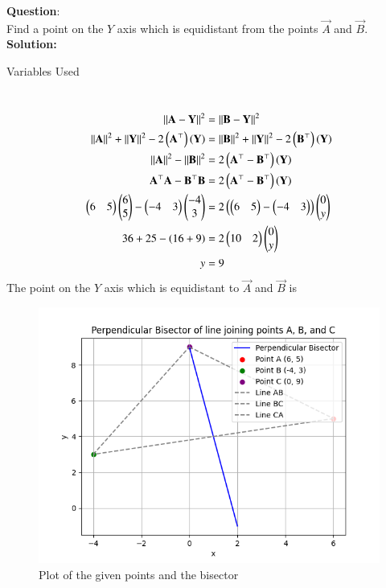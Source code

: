 \documentclass[journal]{IEEEtran}
\begin{document}
\textbf{Question}:\\
Find a point on the $Y$ axis which is equidistant from the points  $\vec{A}$ and $\vec{B}$.
\\
\textbf{Solution: }
\begin{table}[h!]    
  \centering
  
  \caption{Variables Used}
  \label{tab10.5.3.9.1}
\end{table}\\
\begin{align}
||\mathbf{A}-\mathbf{Y}||^2&=||\mathbf{B}-\mathbf{Y}||^2\\
||\mathbf{A}||^2+||\mathbf{Y}||^2-2\left(\mathbf{A}^\top\right)\left(\mathbf{Y}\right)&=||\mathbf{B}||^2+||\mathbf{Y}||^2-2\left(\mathbf{B}^\top\right)\left(\mathbf{Y}\right)\\
||\mathbf{A}||^2-||\mathbf{B}||^2&=2\left(\mathbf{A}^\top-\mathbf{B}^\top\right)\left(\mathbf{Y}\right)\\
\mathbf{{A}^\top}\mathbf{A}-\mathbf{B^\top}\mathbf{B}&=2\left(\mathbf{A}^\top-\mathbf{B}^\top\right)\left(\mathbf{Y}\right)\\
\begin{pmatrix}6&5\end{pmatrix}\begin{pmatrix}6\\5\end{pmatrix}-\begin{pmatrix}-4&3\end{pmatrix}\begin{pmatrix}-4\\3\end{pmatrix}&=2\left(\begin{pmatrix}6&5\end{pmatrix}-\begin{pmatrix}-4&3\end{pmatrix}\right)\begin{pmatrix}0\\y\end{pmatrix}\\
36+25-\left(16+9\right)&=2\begin{pmatrix}10&2\end{pmatrix}\begin{pmatrix}0\\y\end{pmatrix}\\
y&=9
\end{align}
The point on the $Y$ axis which is equidistant to $\vec{A}$ and $\vec{B}$ is 
\begin{figure}[h!]
   \centering
   \includegraphics[width=0.7\linewidth]{figs/fig.png}
   \caption{Plot of the given points and the bisector}
   \label{stemplot}
\end{figure}  
\end{document}
